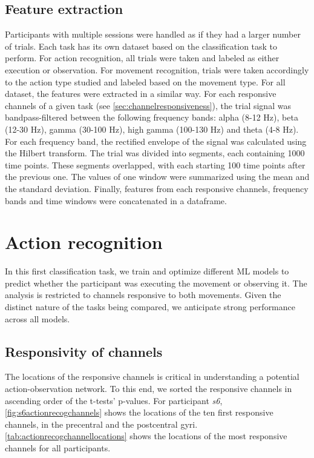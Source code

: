 \documentclass[10pt,conference,compsocconf]{IEEEtran}
\begin{document}
\subsection{Feature extraction}
Participants with multiple sessions were handled as if they had a larger number of trials. Each task has its own dataset based on the classification task to perform. For action recognition, all trials were taken and labeled as either execution or observation. For movement recognition, trials were taken accordingly to the action type studied and labeled based on the movement type. For all dataset, the features were extracted in a similar way. For each responsive channels of a given task (see \ref{sec:channelresponsiveness}), the trial signal was bandpass-filtered between the following frequency bands: alpha (8-12 Hz), beta (12-30 Hz), gamma (30-100 Hz), high gamma (100-130 Hz) and theta (4-8 Hz). For each frequency band, the rectified envelope of the signal was calculated using the Hilbert transform. The trial was divided into segments, each containing 1000 time points. These segments overlapped, with each starting 100 time points after the previous one. The values of one window were summarized using the mean and the standard deviation. Finally, features from each responsive channels, frequency bands and time windows were concatenated in a dataframe.

\section{Action recognition}
\label{sec:actionrecognition}
In this first classification task, we train and optimize different ML models to predict whether the participant was executing the movement or observing it. The analysis is restricted to channels responsive to both movements. Given the distinct nature of the tasks being compared, we anticipate strong performance across all models.

\subsection{Responsivity of channels}
The locations of the responsive channels is critical in understanding a potential action-observation network. To this end, we sorted the responsive channels in ascending order of the t-tests' p-values. For participant \textit{s6}, \autoref{fig:s6actionrecogchannels} shows the locations of the ten first responsive channels, in the precentral and the postcentral gyri. \autoref{tab:actionrecogchannellocations} shows the locations of the most responsive channels for all participants.
\end{document}
